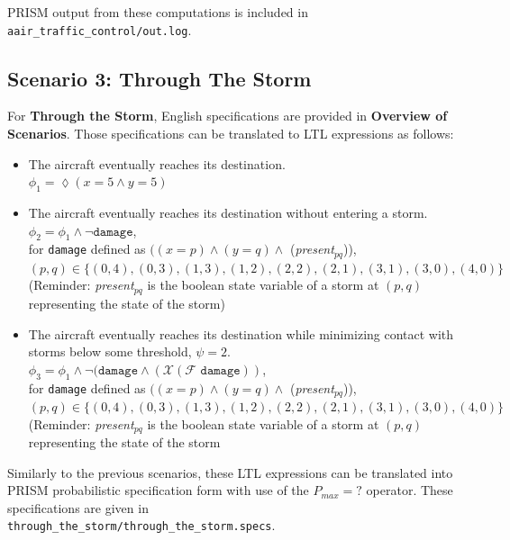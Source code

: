 \documentclass{article}
\begin{document}
PRISM output from these computations is included in \texttt{aair\_traffic\_control/out.log}.

\subsection*{Scenario 3: Through The Storm}

For \textbf{Through the Storm}, English specifications are provided in \textbf{Overview of Scenarios}. Those specifications can be translated to LTL expressions as follows:

\begin{itemize}
 \item The aircraft eventually reaches its destination. \\
 $\phi_1= \lozenge (x=5 \land y=5)$

 \item The aircraft eventually reaches its destination without entering a storm. \\
 $\phi_2= \phi_1 \land \lnot\texttt{damage}$, \\
 for \texttt{damage} defined as $((x = p) \land (y = q) \land $ (\textit{present}$_{pq}$)), $(p,q)\in\{(0,4), (0,3), (1,3), (1,2), (2,2), (2,1), (3,1), (3,0), (4,0)\}$ \\
 (Reminder: \textit{present}$_{pq}$ is the boolean state variable of a storm at $(p,q)$ representing the state of the storm)

 \item The aircraft eventually reaches its destination while minimizing contact with storms below some threshold, $\psi = 2$. \\
 $\phi_3= \phi_1 \land \lnot(\texttt{damage} \land (\mathcal{X}(\mathcal{F}\texttt{ damage}))$, \\
  for \texttt{damage} defined as $((x = p) \land (y = q) \land $ (\textit{present}$_{pq}$)), $(p,q)\in\{(0,4), (0,3), (1,3), (1,2), (2,2), (2,1), (3,1), (3,0), (4,0)\}$
 (Reminder: \textit{present}$_{pq}$ is the boolean state variable of a storm at $(p,q)$ representing the state of the storm
\end{itemize}

Similarly to the previous scenarios, these LTL expressions can be translated into PRISM probabilistic specification form with use of the $P_{max}=?$ operator. These specifications are given in \\
\texttt{through\_the\_storm/through\_the\_storm.specs}.\\
\end{document}
